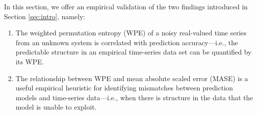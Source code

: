 \documentclass[%
pre,
reprint,
superscriptaddress,
showpacs,
nofootinbib,
nobibnotes,
 amsmath,amssymb,
 aps,
]{revtex4-1}
\newcommand{\cmark}{\ding{51}}
\newcommand{\gcc}{{\tt 403.gcc}\xspace}
\newcommand{\col}{{\tt col\_major}\xspace}
\begin{document}





In this section, we offer an empirical validation of the two findings
introduced in Section \ref{sec:intro}, namely:

\begin{enumerate}

\item The weighted permutation entropy (WPE) of a noisy real-valued
  time series from an unknown system is correlated with prediction
  accuracy---i.e., the predictable structure in an empirical
  time-series data set can be quantified by its WPE.

\item The relationship between WPE and mean absolute scaled error
  (MASE) is a useful empirical heuristic for identifying mismatches
  between prediction models and time-series data---i.e., when there is
  structure in the data that the model is unable to exploit.

\end{enumerate}
\end{document}
